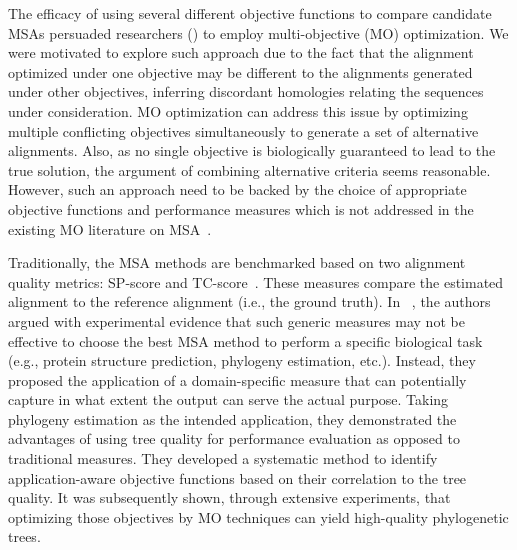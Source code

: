 The efficacy of using several different objective functions to compare candidate MSAs persuaded researchers (\cite{da2010alineaga, ortuno2013optimizing, soto2014multi, abbasi2015local, rubio2016hybrid,zambrano2017comparing, rubio2018characteristic, benitez2020sequoya}) to employ multi-objective (MO) optimization. We were motivated to explore such approach due to the fact that the alignment optimized under one objective may be different to the alignments generated under other objectives, inferring discordant 
homologies relating the sequences under consideration. MO optimization can address this issue by
optimizing multiple conflicting objectives simultaneously to
generate a set of alternative alignments. Also, as no single objective is biologically guaranteed to lead to the true solution, the argument of combining alternative criteria seems reasonable. However, such an approach need to be backed by the choice of appropriate objective functions and performance measures which is not addressed in the existing MO literature on MSA~\cite{nayeem2020multiobjective}.  %


Traditionally, the MSA methods are benchmarked based on two alignment quality metrics: SP-score and TC-score~\cite{warnow2017computational}. These measures compare the estimated alignment to the reference alignment (i.e., the ground truth). In ~\cite{nayeem2020multiobjective, nayeem2019phylogeny}, the authors argued with experimental evidence that such generic measures may not be effective to choose the best MSA method to perform a specific biological task (e.g., protein structure prediction, phylogeny estimation, etc.). Instead, they proposed the application of a domain-specific measure that can potentially capture in what extent the output can serve the actual purpose. Taking phylogeny estimation as the intended application, they demonstrated the advantages of using tree quality for performance evaluation as opposed to traditional measures. They developed a systematic method to identify application-aware objective functions based on their correlation to the tree quality. It was subsequently shown, through extensive experiments, that optimizing those objectives by MO techniques can yield high-quality phylogenetic trees.


